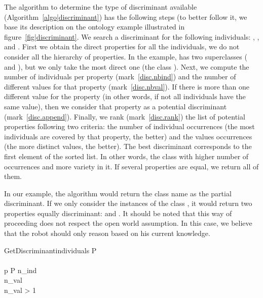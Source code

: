 The algorithm to determine the type of discriminant available
(Algorithm~\ref{algo|discriminant}) has the following steps (to better follow
it, we base its description on the ontology example illustrated in
figure~\ref{fig|discriminant}. We search a discriminant for the following
individuals: , ,  and
. First we obtain the direct properties for all the
individuals, \ie we do not consider all the hierarchy of properties. In the
example,  has two superclasses ( and
), but we only take the most direct one (the class
). Next, we compute the number of individuals per property
(mark~\ref{disc.nbind}) and the number of different values for that property
(mark~\ref{disc.nbval}). If there is more than one different value for the
property (in other words, if not all individuals have the same value), then we
consider that property as a potential discriminant (mark~\ref{disc.append}).
Finally, we rank (mark~\ref{disc.rank}) the list of potential properties
following two criteria: the number of individual occurrences (\ie the most
individuals are covered by that property, the better) and the values
occurrences (\ie the more distinct values, the better).  The best discriminant
corresponds to the first element of the sorted list. In other words, the class
with higher number of occurrences and more variety in it.  If several
properties are equal, we return all of them.

In our example, the algorithm would return the class name as the partial
discriminant. If we only consider the instances of the class ,
it would return two properties equally discriminant:  and
. It should be noted that this way of proceeding does not respect
the open world assumption. In this case, we believe that the robot should only
reason based on his current knowledge.

\small
\begin{pseudocode}[ruled]{GetDiscriminant}{individuals}
\label{algo|discriminant}
\BEGIN
P \GETS {} \\
 \GETS \emptyset \\
\FOREACH p \in P \DO
    \BEGIN
        n_{ind} \GETS {} \\
        n_{val} \GETS {} \\
        \IF n_{val} > 1 \THEN
             \GETS {} \\
    \END \\

 \\
 \\
\END

\end{pseudocode}
\normalsize


